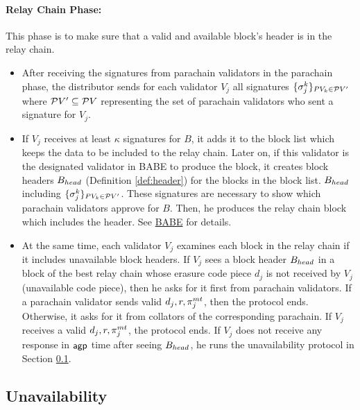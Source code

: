  


\paragraph{Relay Chain Phase:} This phase is to make sure that a valid and available block's header is in the relay chain. 

\begin{itemize}
    \item After receiving the signatures from parachain validators in the parachain phase, the distributor sends  for each validator $V_j$ all signatures  $\{\sigma_j^k\}_{PV_k \in \mathcal{P}V'} $ where $\mathcal{P}V' \subseteq \mathcal{P}V$ representing the set of parachain validators who sent a signature for $V_j$. 

    \item If $V_j$ receives at least $\kappa$ signatures for $B$, it adds it to the block list which keeps the data to be included to the relay chain. Later on, if this validator is the designated validator in BABE to produce the block, it creates block headers $B_{head}$ (Definition \ref{def:header}) for the blocks in the block list. $B_{head}$ including $\{\sigma_j^k\}_{PV_k \in \mathcal{P}V'} $.  These signatures are necessary to show which parachain validators approve for $B$. Then, he produces the relay chain block which includes the header. See \href{http://research.web3.foundation/en/latest/polkadot/BABE/Babe/}{BABE} for details.

    \item At the same time, each validator $V_j$ examines  each block in the relay chain if it includes unavailable block headers. If $V_j$ sees a block header $B_{head}$ in a block of the best relay chain whose erasure code piece $d_j$ is not received by $V_j$ (unavailable code piece), then he asks for it first from parachain validators. If a parachain validator sends valid $d_j, r, \pi^{mt}_j $, then the protocol ends. Otherwise, it asks for it from collators of the corresponding parachain. If $V_j$ receives a valid $d_j, r, \pi^{mt}_j $, the protocol ends. If $V_j$ does not receive any response in $\mathsf{agp}$ time after seeing $B_{head}$, he runs the unavailability protocol in Section \ref{sec:unavail}.

\end{itemize}

\subsection{Unavailability}
\label{sec:unavail}

